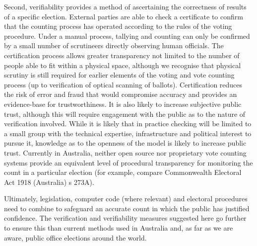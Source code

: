 Second, verifiability provides a method of ascertaining the
correctness of
results of a specific election. External parties are able to check a
certificate to confirm that the counting process has operated
according to the rules of the voting procedure.
Under a manual process, tallying and counting can only be confirmed by a small number of scrutineers directly observing human
officials. The certification process allows greater transparency not
limited to the number of people able to fit within a physical space,
although we recognise that physical scrutiny is still required for
earlier elements of the voting and vote counting process (up to
verification of optical scanning of ballots). Certification reduces
the risk of error and fraud that would compromise accuracy and
provides an evidence-base for trustworthiness. It is also likely to
increase subjective public trust, although this will require
engagement with the public as to the nature of verification
involved. While it is likely that in practice checking will be
limited to a small group with the technical expertise,
infrastructure and political interest to pursue it, knowledge as to
the openness of the model is likely to increase public trust.
Currently in Australia, neither open source nor proprietary vote
counting systems provide an equivalent level of procedural
transparency for monitoring the count in a particular election (for
example, compare Commonwealth Electoral Act 1918 (Australia) s
273A). 

Ultimately, legislation, computer code (where relevant) and
electoral procedures need to combine to safeguard an accurate count
in which the public has justified confidence. The verification and
verifiability measures suggested here go further to ensure this than
current methods used in Australia and, as far as we are aware,
public office elections around the world.


   		
		
   
	

